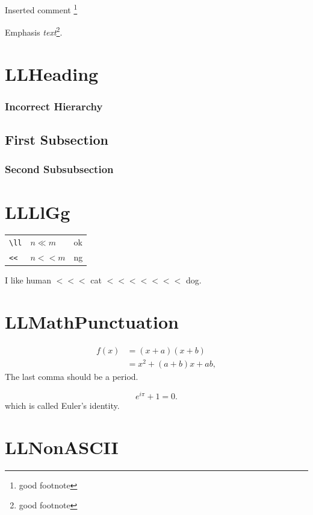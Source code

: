 \documentclass[a4paper]{article}
\newcommand{\tA}[1]{\textcolor{cA}{#1}}
\newcommand{\tD}[1]{\textcolor{cD}{#1}}
\begin{document}
Inserted comment%
\footnote{good footnote}

Emphasis \emph{text}\footnote{good footnote}.

\section{LLHeading}

\subsubsection{Incorrect Hierarchy}

\subsection{First Subsection}
\subsubsection{Second Subsubsection}

\section{LLLlGg}

\begin{table}[H]
	\centering
	\begin{tabular}{lll}
		\verb|\ll| & $n\ll m$ & \tA{ok} \\
		\verb|<<|  & $n << m$ & \tD{ng} \\
	\end{tabular}
\end{table}

I like human $<<<$ cat $<<<<<<<$ dog.

\section{LLMathPunctuation}

\begin{align}
	f(x) & = (x+a)(x+b)         \\
	     & = x^2 + (a+b)x + ab,
\end{align}
The last comma should be a period.

\begin{equation*}
	e^{i \pi}+1=0.
\end{equation*}
which is called Euler's identity.

\section{LLNonASCII}
\end{document}
